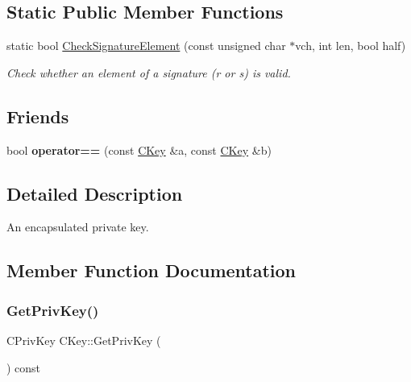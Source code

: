 \subsection*{Static Public Member Functions}
\begin{DoxyCompactItemize}
\item 
\mbox{\label{class_c_key_a625c363d9adfbd4dda22f3a67a898cf4}} 
static bool \mbox{\hyperlink{class_c_key_a625c363d9adfbd4dda22f3a67a898cf4}{Check\+Signature\+Element}} (const unsigned char $\ast$vch, int len, bool half)
\begin{DoxyCompactList}\small\item\em Check whether an element of a signature (r or s) is valid. \end{DoxyCompactList}\end{DoxyCompactItemize}
\subsection*{Friends}
\begin{DoxyCompactItemize}
\item 
\mbox{\label{class_c_key_a381efd9184dc467e73e690329c70371d}} 
bool {\bfseries operator==} (const \mbox{\hyperlink{class_c_key}{C\+Key}} \&a, const \mbox{\hyperlink{class_c_key}{C\+Key}} \&b)
\end{DoxyCompactItemize}


\subsection{Detailed Description}
An encapsulated private key. 

\subsection{Member Function Documentation}
\mbox{\label{class_c_key_a91b6ecf71cc16e0b05ce79ec9276e729}} 
\subsubsection{\texorpdfstring{Get\+Priv\+Key()}{GetPrivKey()}}
{\footnotesize\ttfamily C\+Priv\+Key C\+Key\+::\+Get\+Priv\+Key (\begin{DoxyParamCaption}{ }\end{DoxyParamCaption}) const}

